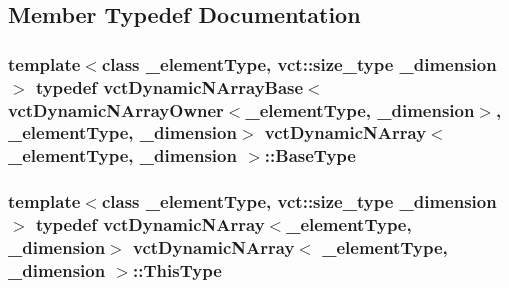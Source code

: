 \subsection{Member Typedef Documentation}
\hypertarget{classvct_dynamic_n_array_adc62cbbc97a16fa388dd96d4404fd075}{
\subsubsection[{Base\-Type}]{\setlength{\rightskip}{0pt plus 5cm}template$<$class \-\_\-element\-Type, vct\-::size\-\_\-type \-\_\-dimension$>$ typedef {\bf vct\-Dynamic\-N\-Array\-Base}$<${\bf vct\-Dynamic\-N\-Array\-Owner}$<$\-\_\-element\-Type, \-\_\-dimension$>$, \-\_\-element\-Type, \-\_\-dimension$>$ {\bf vct\-Dynamic\-N\-Array}$<$ \-\_\-element\-Type, \-\_\-dimension $>$\-::{\bf Base\-Type}}}\label{classvct_dynamic_n_array_adc62cbbc97a16fa388dd96d4404fd075}
\hypertarget{classvct_dynamic_n_array_a159dfdd698115f12caf629f7539029f5}{
\subsubsection[{This\-Type}]{\setlength{\rightskip}{0pt plus 5cm}template$<$class \-\_\-element\-Type, vct\-::size\-\_\-type \-\_\-dimension$>$ typedef {\bf vct\-Dynamic\-N\-Array}$<$\-\_\-element\-Type, \-\_\-dimension$>$ {\bf vct\-Dynamic\-N\-Array}$<$ \-\_\-element\-Type, \-\_\-dimension $>$\-::{\bf This\-Type}}}\label{classvct_dynamic_n_array_a159dfdd698115f12caf629f7539029f5}


